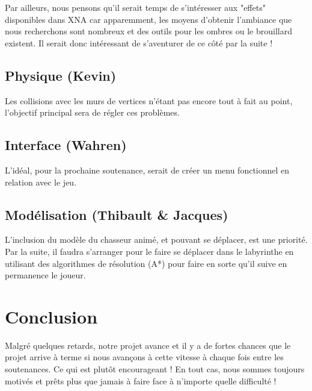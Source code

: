 \documentclass[12pt,a4paper]{article}  %
\begin{document}
Par ailleurs, nous pensons qu'il serait temps de s'intéresser aux "effets" disponibles dans XNA car apparemment, les moyens d'obtenir l'ambiance que nous recherchons sont nombreux et des outils pour les ombres ou le brouillard existent. Il serait donc intéressant de s'aventurer de ce côté par la suite !

\subsection {Physique (Kevin)}
Les collisions avec les murs de vertices n'étant pas encore tout à fait au point, l'objectif principal sera de régler ces problèmes.

\subsection {Interface (Wahren)}
L'idéal, pour la prochaine soutenance, serait de créer un menu fonctionnel en relation avec le jeu.

\subsection {Modélisation (Thibault & Jacques)}
L'inclusion du modèle du chasseur animé, et pouvant se déplacer, est une priorité. Par la suite, il faudra s'arranger pour le faire se déplacer dans le labyrinthe en utilisant des algorithmes de résolution (A*) pour faire en sorte qu'il suive en permanence le joueur.

\section {Conclusion}
Malgré quelques retards, notre projet avance et il y a de fortes chances que le projet arrive à terme si nous avançons à cette vitesse à chaque fois entre les soutenances. Ce qui est plutôt encourageant ! En tout cas, nous sommes toujours motivés et prêts plus que jamais à faire face à n'importe quelle difficulté !
\end{document}
